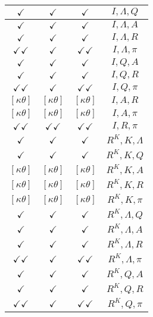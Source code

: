 \documentclass[a4paper,10pt]{article}
\begin{document}
\begin{longtable}{|c|c|c|c|}
\hline
$\checkmark$ & $\checkmark$ & $\checkmark$ & ${I},{\Lambda},{Q}$ \\
\hline
$\checkmark$ & $\checkmark$ & $\checkmark$ & ${I},{\Lambda},{A}$ \\
\hline
$\checkmark$ & $\checkmark$ & $\checkmark$ & ${I},{\Lambda},{R}$ \\
\hline
$\checkmark\checkmark$ & $\checkmark$ & $\checkmark\checkmark$ & ${I},{\Lambda},{\pi}$ \\
\hline
$\checkmark$ & $\checkmark$ & $\checkmark$ & ${I},{Q},{A}$ \\
\hline
$\checkmark$ & $\checkmark$ & $\checkmark$ & ${I},{Q},{R}$ \\
\hline
$\checkmark\checkmark$ & $\checkmark$ & $\checkmark\checkmark$ & ${I},{Q},{\pi}$ \\
\hline
$[\kappa \theta ]$ & $[\kappa \theta ]$ & $[\kappa \theta ]$ & ${I},{A},{R}$ \\
\hline
$[\kappa \theta ]$ & $[\kappa \theta ]$ & $[\kappa \theta ]$ & ${I},{A},{\pi}$ \\
\hline
$\checkmark\checkmark$ & $\checkmark\checkmark$ & $\checkmark\checkmark$ & ${I},{R},{\pi}$ \\
\hline
$\checkmark$ & $\checkmark$ & $\checkmark$ & ${R^{K}},{K},{\Lambda}$ \\
\hline
$\checkmark$ & $\checkmark$ & $\checkmark$ & ${R^{K}},{K},{Q}$ \\
\hline
$[\kappa \theta ]$ & $[\kappa \theta ]$ & $[\kappa \theta ]$ & ${R^{K}},{K},{A}$ \\
\hline
$[\kappa \theta ]$ & $[\kappa \theta ]$ & $[\kappa \theta ]$ & ${R^{K}},{K},{R}$ \\
\hline
$[\kappa \theta ]$ & $[\kappa \theta ]$ & $[\kappa \theta ]$ & ${R^{K}},{K},{\pi}$ \\
\hline
$\checkmark$ & $\checkmark$ & $\checkmark$ & ${R^{K}},{\Lambda},{Q}$ \\
\hline
$\checkmark$ & $\checkmark$ & $\checkmark$ & ${R^{K}},{\Lambda},{A}$ \\
\hline
$\checkmark$ & $\checkmark$ & $\checkmark$ & ${R^{K}},{\Lambda},{R}$ \\
\hline
$\checkmark\checkmark$ & $\checkmark$ & $\checkmark\checkmark$ & ${R^{K}},{\Lambda},{\pi}$ \\
\hline
$\checkmark$ & $\checkmark$ & $\checkmark$ & ${R^{K}},{Q},{A}$ \\
\hline
$\checkmark$ & $\checkmark$ & $\checkmark$ & ${R^{K}},{Q},{R}$ \\
\hline
$\checkmark\checkmark$ & $\checkmark$ & $\checkmark\checkmark$ & ${R^{K}},{Q},{\pi}$ \\

\end{longtable}
\end{document}
